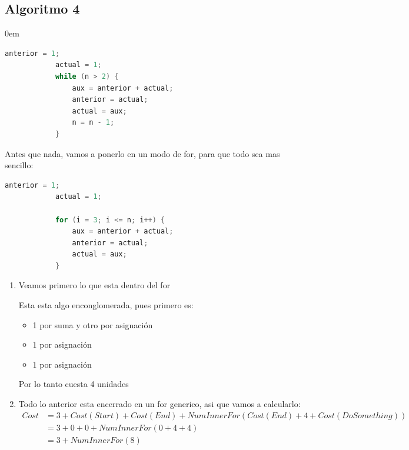 \documentclass[12pt, fleqn]{article}                            %
\newenvironment{SmallIndentation}[1][0.75em]                    %
        {\begin{adjustwidth}{#1}{}\begin{footnotesize}}             %
        {\end{footnotesize}\end{adjustwidth}}                       %
\theoremstyle{break}                                            %
\begin{document}
    \subsection{Algoritmo 4}
    \begin{SmallIndentation}[0em]
            
        \begin{lstlisting}[language=C, gobble=12, basicstyle=\small\color{white}]
            anterior = 1;                   
            actual = 1;                     
            while (n > 2) {
                aux = anterior + actual;    
                anterior = actual;          
                actual = aux;               
                n = n - 1;
            }
        \end{lstlisting}   

        Antes que nada, vamos a ponerlo en un modo de for, para que todo sea mas sencillo:
        \begin{lstlisting}[language=C, gobble=12, basicstyle=\small\color{white}]
            anterior = 1;                   
            actual = 1;  

            for (i = 3; i <= n; i++) {                  
                aux = anterior + actual;    
                anterior = actual;          
                actual = aux;               
            }
        \end{lstlisting} 

        \begin{enumerate}
            \item
                Veamos primero lo que esta dentro del for

                Esta esta algo enconglomerada, pues primero es:
                \begin{itemize}
                    \item 1 por suma y otro por asignación
                    \item 1 por asignación
                    \item 1 por asignación
                \end{itemize}

                Por lo tanto cuesta 4 unidades


            \item Todo lo anterior esta encerrado en un for generico, 
                asi que vamos a calcularlo:
                \begin{align*}
                    Cost 
                        &= 3 + Cost(Start) + Cost(End) + NumInnerFor(Cost(End) + 4 + Cost(DoSomething))     \\
                        &= 3 + 0 + 0 + NumInnerFor(0+ 4 + 4)                \\
                        &= 3 + NumInnerFor(8)                
                \end{align*}


\end{enumerate}
\end{SmallIndentation}
\end{document}
